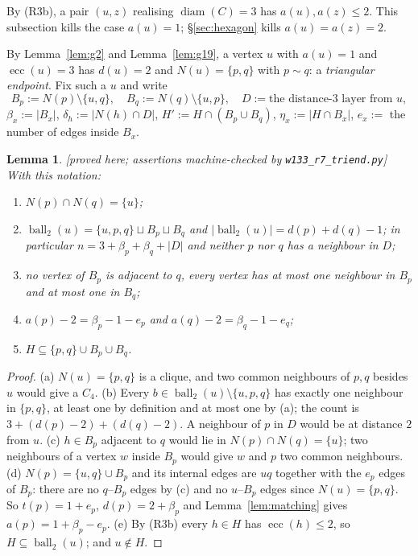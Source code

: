 \documentclass[11pt]{article}
\theoremstyle{plain}
\newtheorem{lemma}[theorem]{Lemma}
\theoremstyle{definition}
\theoremstyle{remark}
\numberwithin{equation}{section}
\newcommand{\ecc}{\operatorname{ecc}}
\newcommand{\diam}{\operatorname{diam}}
\newcommand{\ball}{\operatorname{ball}}
\newcommand{\statusbox}[1]{{\small\sloppy\textsf{[#1]}}}
\newcommand{\PRV}[1]{\statusbox{proved here; assertions machine-checked by \texttt{#1}}}
\begin{document}
By (R3b), a pair $(u,z)$ realising $\diam(C) = 3$ has $a(u), a(z) \le 2$. This subsection
kills the case $a(u) = 1$; \S\ref{sec:hexagon} kills $a(u) = a(z) = 2$.

By Lemma~\ref{lem:g2} and Lemma~\ref{lem:g19}, a vertex $u$ with $a(u) = 1$ and
$\ecc(u) = 3$ has $d(u) = 2$ and $N(u) = \{p,q\}$ with $p \sim q$: a \emph{triangular
endpoint}. Fix such a $u$ and write
\[
  B_p := N(p)\setminus\{u,q\},\quad B_q := N(q)\setminus\{u,p\},\quad
  D := \text{the distance-}3\text{ layer from } u,
\]
$\beta_x := |B_x|$, $\delta_h := |N(h)\cap D|$, $H' := H \cap (B_p \cup B_q)$,
$\eta_x := |H \cap B_x|$, $e_x := $ the number of edges inside $B_x$.

\begin{lemma}\label{lem:g23}
\PRV{w133\_r7\_triend.py}
With this notation:
\begin{enumerate}
\item[(a)] $N(p)\cap N(q) = \{u\}$;
\item[(b)] $\ball_2(u) = \{u,p,q\} \sqcup B_p \sqcup B_q$ and
$|\ball_2(u)| = d(p)+d(q)-1$; in particular $n = 3 + \beta_p + \beta_q + |D|$ and neither $p$
nor $q$ has a neighbour in $D$;
\item[(c)] no vertex of $B_p$ is adjacent to $q$, every vertex has at most one neighbour in
$B_p$ and at most one in $B_q$;
\item[(d)] $a(p) - 2 = \beta_p - 1 - e_p$ and $a(q) - 2 = \beta_q - 1 - e_q$;
\item[(e)] $H \subseteq \{p,q\}\cup B_p \cup B_q$.
\end{enumerate}
\end{lemma}

\begin{proof}
(a) $N(u) = \{p,q\}$ is a clique, and two common neighbours of $p,q$ besides $u$ would give a
$C_4$. (b) Every $b \in \ball_2(u)\setminus\{u,p,q\}$ has exactly one neighbour in $\{p,q\}$,
at least one by definition and at most one by (a); the count is $3 + (d(p)-2)+(d(q)-2)$. A
neighbour of $p$ in $D$ would be at distance $2$ from $u$. (c) $h \in B_p$ adjacent to $q$
would lie in $N(p)\cap N(q) = \{u\}$; two neighbours of a vertex $w$ inside $B_p$ would give
$w$ and $p$ two common neighbours. (d) $N(p) = \{u,q\}\cup B_p$ and its internal edges are
$uq$ together with the $e_p$ edges of $B_p$: there are no $q$--$B_p$ edges by (c) and no
$u$--$B_p$ edges since $N(u) = \{p,q\}$. So $t(p) = 1 + e_p$, $d(p) = 2 + \beta_p$ and
Lemma~\ref{lem:matching} gives $a(p) = 1 + \beta_p - e_p$. (e) By (R3b) every $h \in H$ has
$\ecc(h)\le 2$, so $H \subseteq \ball_2(u)$; and $u \notin H$.
\end{proof}
\end{document}
